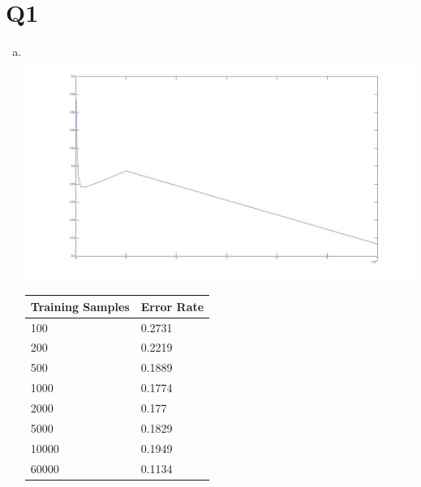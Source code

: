 \documentclass[12pt]{article}
\begin{document}
\section*{Q1}
  \begin{enumerate}[a.]
    \item \quad \\
      \includegraphics[scale=0.3]{q1_pixel_error.jpg}
      \begin{tabular}{l|l}
        \hline
        Training Samples & Error Rate \\
        \hline
        100   & 0.2731 \\
        200   & 0.2219 \\
        500   & 0.1889 \\
        1000  & 0.1774 \\
        2000  & 0.177  \\
        5000  & 0.1829 \\
        10000 & 0.1949 \\
        60000 & 0.1134 \\
      \end{tabular}
  \end{enumerate}
\newpage
\end{document}

